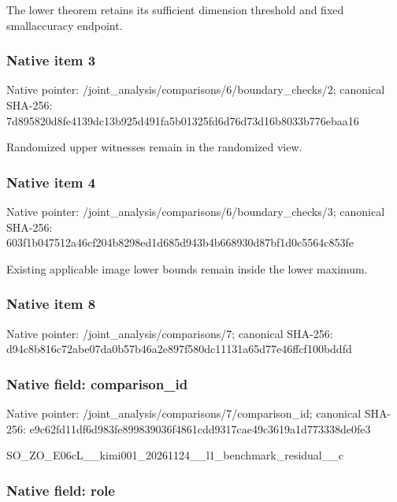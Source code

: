 \documentclass[10pt,a4paper]{article}
\begin{document}
The lower theorem retains its sufficient dimension threshold and fixed smallaccuracy endpoint.


\subsubsection{Native item 3}


Native pointer: /joint\_analysis/comparis\allowbreak{}ons/6/boundary\_checks/2; canonical SHA-256: 7d895820d8fe4139dc13b925\allowbreak{}d491fa5b01325fd6d76d73d1\allowbreak{}6b8033b776ebaa16


Randomized upper witnesses remain in the randomized view.


\subsubsection{Native item 4}


Native pointer: /joint\_analysis/comparis\allowbreak{}ons/6/boundary\_checks/3; canonical SHA-256: 603f1b047512a46cf204b829\allowbreak{}8ed1d685d943b4b668930d87\allowbreak{}bf1d0c5564c853fe


Existing applicable image lower bounds remain inside the lower maximum.


\subsubsection{Native item 8}


Native pointer: /joint\_analysis/comparisons/7; canonical SHA-256: d94c8b816c72abe07da0b57b\allowbreak{}46a2e897f580dc11131a65d7\allowbreak{}7e46ffcf100bddfd



\subsubsection{Native field: comparison\_id}


Native pointer: /joint\_analysis/comparis\allowbreak{}ons/7/comparison\_id; canonical SHA-256: e9c62fd11df6d983fe899839\allowbreak{}036f4861cdd9317cae49c361\allowbreak{}9a1d773338de0fe3


SO\_ZO\_E06cL\_\_kimi001\_202\allowbreak{}61124\_\_l1\_benchmark\_resi\allowbreak{}dual\_\_c


\subsubsection{Native field: role}
\end{document}
